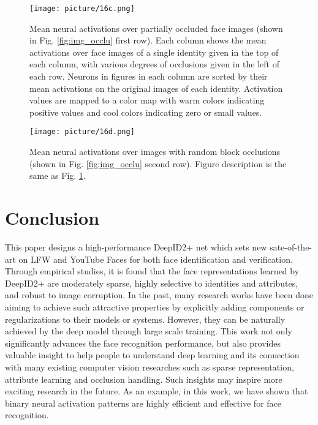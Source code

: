 \documentclass[10pt,twocolumn,letterpaper]{article}
\begin{document}
\begin{figure}[t]
\begin{center}
\texttt{[image: picture/16c.png]}
\end{center}
\vspace{-0.1in}
\caption{Mean neural activations over partially occluded face images (shown in Fig. \ref{fig:img_occlu} first row). Each column shows the mean activations over face images of a single identity given in the top of each column, with various degrees of occlusions given in the left of each row. Neurons in figures in each column are sorted by their mean activations on the original images of each identity. Activation values are mapped to a color map with warm colors indicating positive values and cool colors indicating zero or small values.}
\label{fig:act_occlu_part}
\vspace{-0.05in}
\end{figure}

\begin{figure}[t]
\begin{center}
\texttt{[image: picture/16d.png]}
\end{center}
\vspace{-0.1in}
\caption{Mean neural activations over images with random block occlusions (shown in Fig. \ref{fig:img_occlu} second row). Figure description is the same as Fig. \ref{fig:act_occlu_part}.}
\label{fig:act_occlu_rb}
\vspace{-0.05in}
\end{figure}


\section{Conclusion}

This paper designs a high-performance DeepID2+ net which sets new sate-of-the-art on LFW and YouTube Faces for both face identification and verification. Through  empirical studies, it is found that the face representations learned by DeepID2+ are moderately sparse, highly selective to identities and attributes, and robust to image corruption. In the past, many research works have been done aiming to achieve such attractive properties by explicitly adding components or regularizations to their models or systems. However, they can be naturally achieved by the deep model through large scale training. This work not only significantly advances the face recognition performance, but also provides valuable insight to help people to understand deep learning and its connection with many existing computer vision researches such as sparse representation, attribute learning and occlusion handling. Such insights may inspire  more exciting research in the future. As an example, in this work, we have shown that binary neural activation patterns are highly efficient and effective for face recognition.

{\small


}
\end{document}
